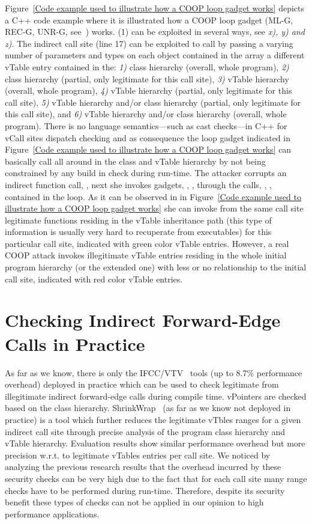 Figure~\ref{Code example used to illustrate how a COOP loop gadget works}
depicts a C++ code example where it is illustrated how a COOP loop gadget 
(ML-G, REC-G, UNR-G, see~\cite{crane:readactor++}) works.
(1) can be exploited in several ways, see \textit{x), y) and z)}.
The indirect call site (line 17) can be exploited 
to call by passing a varying number of parameters and types
on each object contained in the array a different
vTable entry contained in the:
\textit{1)} class hierarchy (overall, whole program),
\textit{2)} class hierarchy (partial, only legitimate for this call site),
\textit{3)} vTable hierarchy (overall, whole program),
\textit{4)} vTable hierarchy (partial, only legitimate for this call site),
\textit{5)} vTable hierarchy and/or class hierarchy (partial, only legitimate for this call site), and
\textit{6)} vTable hierarchy and/or class hierarchy (overall, whole program).
There is no language semantics---such as cast checks---in C++ for vCall sites dispatch checking and as consequence
the loop gadget indicated in Figure~\ref{Code example used to illustrate how a COOP loop gadget works}
can basically call all around in the class and vTable hierarchy by not being constrained by any build in check during
run-time. The attacker corrupts an indirect function call, , 
next she invokes gadgets,  , , 
through the calls, , , contained in the loop. 
As it can be observed in in Figure~\ref{Code example used to illustrate how a COOP loop gadget works} she 
can invoke from the same call site legitimate functions residing in the vTable inheritance path
(this type of information is usually very hard to recuperate from executables)
for this particular call site, indicated with green color vTable entries. 
However, a real COOP attack invokes illegitimate
vTable entries residing in the whole initial program hierarchy (or the extended one)
with less or no relationship to the initial call site,
indicated with red color vTable entries.

\section{Checking Indirect Forward-Edge Calls in Practice}
\label{C++ Indirect Calls in Practice}
As far as we know, there is only the IFCC/VTV~\cite{vtv:tice} tools (up to 8.7\% performance overhead) deployed in practice
which can be used to check legitimate from illegitimate indirect forward-edge calls during compile time.
vPointers are checked based on the class hierarchy. ShrinkWrap~\cite{haller:shrinkwrap} (as far as we know not deployed in practice)
is a tool which further reduces the legitimate vTbles ranges for a given indirect call site
through precise analysis of the program class hierarchy and vTable hierarchy. 
Evaluation results show similar performance overhead but more precision w.r.t. to legitimate vTables entries per call site.
We noticed by analyzing the previous research results that the overhead incurred by
these security checks can be very high due to the fact that for each call site many range checks 
have to be performed during run-time. Therefore, despite its security benefit these types of
checks can not be applied in our opinion to high performance applications.

